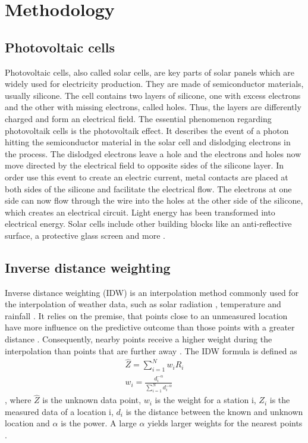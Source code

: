 \documentclass{article}
\begin{document}
\section{Methodology}
\subsection{Photovoltaic cells}\label{sec:pv}

Photovoltaic cells, also called solar cells, are key parts of solar panels which are widely used for electricity production.
They are made of semiconductor materials, usually silicone. The cell contains two layers of silicone, one with excess electrons and the other with missing electrons, called holes. Thus, the layers are differently charged and form an electrical field. 
The essential phenomenon regarding photovoltaik cells is the photovoltaik effect. It describes the event of a photon hitting the semiconductor material in the solar cell and dislodging electrons in the process. The dislodged electrons leave a hole and the electrons and holes now move directed by the electrical field to opposite sides of the silicone layer. In order use this event to create an electric current, metal contacts are placed at both sides of the silicone and facilitate the electrical flow. The electrons at one side can now flow through the wire into the holes at the other side of the silicone, which creates an electrical circuit. Light energy has been transformed into electrical energy. Solar cells include other building blocks like an anti-reflective surface, a protective glass screen and more \citep{SolarCells}.

\subsection{Inverse distance weighting}
Inverse distance weighting (IDW) is an interpolation method commonly used for the interpolation of weather data, such as solar radiation \cite{Loghmari2018}, temperature \cite{Cao2009} and rainfall \cite{Chen2012}. 
It relies on the premise, that points close to an unmeasured location have more influence on the predictive outcome than those points with a greater distance \cite{Chen2012}. 
Consequently, nearby points receive a higher weight during the interpolation than points that are further away \cite{Lu2008}. 
The IDW formula is defined as
\begin{align}
    \hat{Z} = \sum_{i=1}^N w_iR_i \\
    w_i = \frac{d_i^{-\alpha}}{\sum_{i=1}^N{d_i^{-\alpha}}}
\end{align} \cite{Chen2012},
 where $\hat{Z}$ is the unknown data point, $w_i$ is the weight for a station i, $Z_i$ is the measured data of a location i, $d_i$ is the distance between the known and unknown location and $\alpha$ is the power. 
 A large $\alpha$ yields larger weights for the nearest points \cite{Lu2008}.
\end{document}
